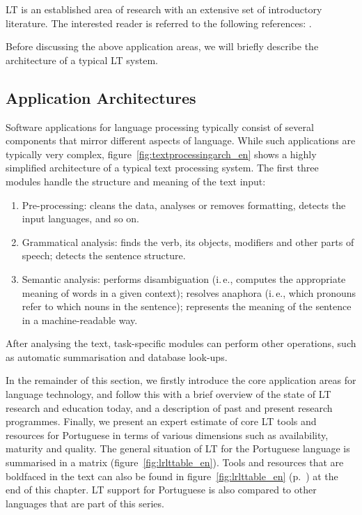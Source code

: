 \documentclass[]{../metanetpaper}
\begin{document}
\begin{multicols}{2}
LT is an established area of research with an extensive set of introductory literature. The interested reader is referred to the following references:  \cite{carstensen-etal1, jurafsky-martin01, manning-schuetze1, lt-world1, lt-survey1}.

Before discussing the above application areas, we will briefly describe the architecture of a typical LT system.

\subsection{Application Architectures}

Software applications for language processing typically consist of several components that mirror different aspects of language. While such applications are typically very complex, figure~\ref{fig:textprocessingarch_en} shows a highly simplified architecture of a typical text processing system. The first three modules handle the structure and meaning of the text input:

\begin{enumerate}
\item Pre-processing: cleans the data, analyses or removes formatting, detects the input languages, and so on.
\item Grammatical analysis: finds the verb, its objects, modifiers and other parts of speech; detects the sentence structure.
\item Semantic analysis: performs disambiguation (i.\,e., computes the appropriate meaning of words in a given context); resolves anaphora (i.\,e., which pronouns refer to which nouns in the sentence); represents the meaning of the sentence in a machine-readable way.
\end{enumerate}

After analysing the text, task-specific modules can perform other operations, such as automatic summarisation and database look-ups.

In the remainder of this section, we firstly introduce the core application areas for language technology, and follow this with a brief overview of the state of LT research and education today, and a description of past and present research programmes. Finally, we present an expert estimate of core LT tools and resources for Portuguese in terms of various dimensions such as availability, maturity and quality. The general situation of LT for the Portuguese language is summarised in a matrix (figure~\ref{fig:lrlttable_en}). Tools and resources that are boldfaced in the text can also be found in figure~\ref{fig:lrlttable_en} (p.~\pageref{fig:lrlttable_en}) at the end of this chapter. LT support for Portuguese is also compared to other languages that are part of this series.


\end{multicols}
\end{document}
